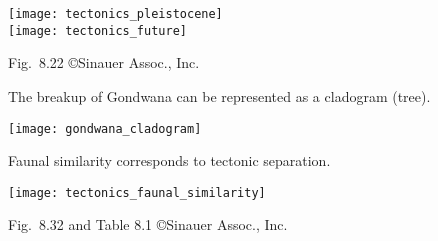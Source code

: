 \documentclass[t]{beamer}
\begin{document}
%
\begin{frame}[t]

	{\centering
	\texttt{[image: tectonics\_pleistocene]}\\[1ex]
	\texttt{[image: tectonics\_future]}\par
	}
	
	\vfilll
	
	\hfill \tiny Fig.~8.22 \copyright Sinauer Assoc., Inc.
\end{frame}
%
%
%	
%	
%
\begin{frame}[t]{The breakup of Gondwana can be represented as a cladogram (tree).}

	\vspace*{-1\baselineskip}
	
	{\centering
	\texttt{[image: gondwana\_cladogram]}\par
	}
	
	\vfilll
	
\end{frame}
%
\begin{frame}[t]{Faunal similarity corresponds to tectonic separation.}

	{\centering
	\texttt{[image: tectonics\_faunal\_similarity]}\par
	}
	
	\vfilll
	
	\hfill \tiny Fig.~8.32 and Table 8.1 \copyright Sinauer Assoc., Inc.
\end{frame}
%
\end{document}
